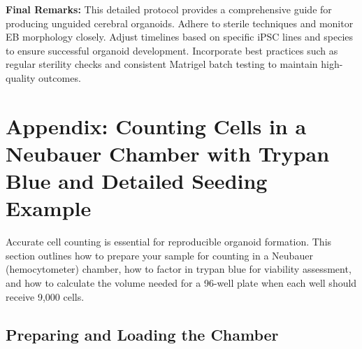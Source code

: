\documentclass[11pt]{article}
\begin{document}
\vspace{0.5em}
\noindent \textbf{Final Remarks:}  
This detailed protocol provides a comprehensive guide for producing unguided cerebral organoids. Adhere to sterile techniques and monitor EB morphology closely. Adjust timelines based on specific iPSC lines and species to ensure successful organoid development. Incorporate best practices such as regular sterility checks and consistent Matrigel batch testing to maintain high-quality outcomes.

\appendix
\section{Appendix: Counting Cells in a Neubauer Chamber with Trypan Blue and Detailed Seeding Example}
\label{sec:counting_app}

Accurate cell counting is essential for reproducible organoid formation. This section outlines how to prepare your sample for counting in a Neubauer (hemocytometer) chamber, how to factor in trypan blue for viability assessment, and how to calculate the volume needed for a 96-well plate when each well should receive 9,000 cells.

\subsection{Preparing and Loading the Chamber}
\end{document}
